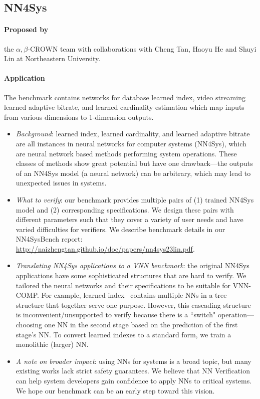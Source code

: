 \documentclass[oneside,11pt,dvipsnames]{book}
\begin{document}

\pagebreak
\subsection{NN4Sys}
\paragraph*{Proposed by} the $\alpha,\!\beta$-CROWN team with collaborations with Cheng Tan, Haoyu He and Shuyi Lin at Northeastern University.
\paragraph*{Application}
The benchmark contains networks for database learned index, video streaming learned adaptive bitrate, and learned cardinality
estimation which map inputs from various dimensions to 1-dimension outputs.

\begin{itemize}

\item \textit{Background}: learned index, learned cardinality, and learned
    adaptive bitrate are all instances in neural networks for computer systems
        (NN4Sys), which are neural network based methods performing system
        operations. These classes of methods show great potential but have one
        drawback---the outputs of an NN4Sys model (a neural network) can be
        arbitrary, which may lead to unexpected issues in systems.

\item \textit{What to verify}: our benchmark provides multiple pairs of (1) trained NN4Sys model
and (2) corresponding specifications. We design these pairs with different parameters such
that they cover a variety of user needs and have varied difficulties for verifiers. 
We describe benchmark details in our NN4SysBench report:
        \url{http://naizhengtan.github.io/doc/papers/nn4sys23lin.pdf}.

\item \textit{Translating NN4Sys applications to a VNN benchmark}: 
the original NN4Sys applications have some sophisticated structures that are hard to verify.
We tailored the neural networks and their specifications to be suitable for VNN-COMP.
For example, learned index~\cite{kraska18case} contains multiple NNs in a tree structure that together serve one purpose.
However, this cascading structure is inconvenient/unsupported to verify
because there is a ``switch" operation---choosing one NN in the second stage
based on the prediction of the first stage's NN.
To convert learned indexes to a standard form, we train a monolithic (larger) NN.

\item \textit{A note on broader impact}: using NNs for systems is a broad topic, but many existing works
lack strict safety guarantees. We believe that NN Verification can help system developers gain confidence
to apply NNs to critical systems. We hope our benchmark can be an early step toward this vision.

\end{itemize}
\end{document}
